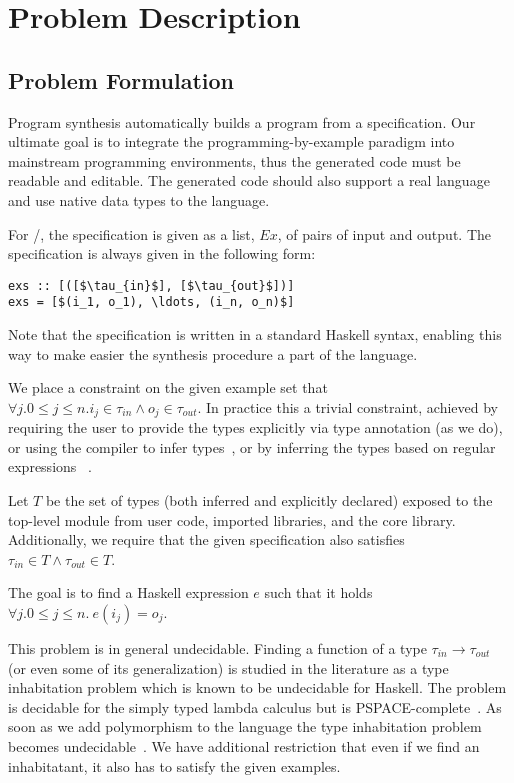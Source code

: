 \section{Problem Description}
\label{problem}

\subsection{Problem Formulation}


Program synthesis automatically builds a program from a specification.
Our ultimate goal is to integrate the programming-by-example paradigm 
into mainstream programming environments, thus the generated code must be readable and editable. The generated code should also support a real language and use native data types to the language.

For \ourTool/, the specification is given as a list, $Ex$, of pairs of input and output. The specification is always given in the following 
form:
\begin{lstlisting}[mathescape=true]
exs :: [([$\tau_{in}$], [$\tau_{out}$])]
exs = [$(i_1, o_1), \ldots, (i_n, o_n)$]
\end{lstlisting}


Note that the specification is written in a standard Haskell syntax, enabling this way to make easier the synthesis procedure a part of the language.

We place a constraint on the given example set that $\forall j. 0 \le j \le n. i_j \in \tau_{in} \land o_j \in \tau_{out}$. In practice this a trivial constraint, achieved by requiring the user to provide the types explicitly via type annotation (as we do), or using the compiler to infer types~\cite{ghc}, or by inferring the types based on regular expressions~\cite{gulwani_popl15} .

Let $T$ be the set of types (both inferred and explicitly declared) exposed to the top-level module from user code, imported libraries, and the core library. Additionally, we require that the given specification also satisfies $\tau_{in} \in T \land
\tau_{out} \in T$.

The goal is to find a Haskell expression $e$ such that it holds $\forall j. 0 \le j \le n.\  e (i_j) = o_j$.

This problem is in general undecidable. Finding a function of a type 
$\tau_{in} \rightarrow \tau_{out}$ (or even some of its generalization) is studied in the literature as a type inhabitation problem which is known to be undecidable 
for Haskell. The problem is decidable for 
 the simply typed lambda calculus but is PSPACE-complete~\cite{DBLP:conf/tlca/Urzyczyn97}. 
 As soon as we add polymorphism to the language the type inhabitation problem becomes undecidable~\cite{DBLP:conf/lics/Wells94}. We have additional restriction that even if we find an inhabitatant, it also has to satisfy the given examples.
 

